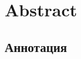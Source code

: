 \chapter*{Abstract}


\clearpage
\begin{otherlanguage}{russian}
\chapter*{Аннотация}

\end{otherlanguage}
